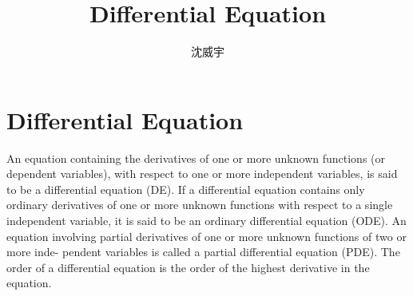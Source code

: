 \documentclass[a4paper,12pt]{report}
\begin{document}
\title{Differential Equation}
\author{沈威宇}
\date{\temtoday}
\titletocdoc
\chapter{Differential Equation}
An equation containing the derivatives of one or more unknown functions (or
dependent variables), with respect to one or more independent variables, is
said to be a differential equation (DE).
If a differential equation contains only ordinary
derivatives of one or more unknown functions with respect to a single independent
variable, it is said to be an ordinary differential equation (ODE). An equation
involving partial derivatives of one or more unknown functions of two or more inde-
pendent variables is called a partial differential equation (PDE).
The order of a differential equation is the order of the highest derivative in the equation.
\end{document}
